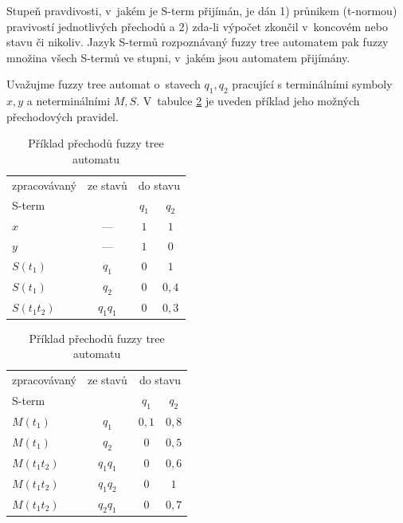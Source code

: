
Stupeň pravdivosti, v~jakém je S-term přijímán, je dán 1) průnikem (t-normou) pravivostí jednotlivých přechodů a 2) zda-li výpočet zkončil v~koncovém nebo stavu či nikoliv. Jazyk S-termů rozpoznávaný fuzzy tree automatem pak fuzzy množina všech S-termů ve stupni, v~jakém jsou automatem přijímány.

\begin{example}
  Uvažujme fuzzy tree automat o~stavech $q_1, q_2$ pracující s terminálními symboly $x, y$ a neterminálními $M, S$. V~tabulce \ref{tab:FuzTreAutTrans} je uveden příklad jeho možných přechodových pravidel.
\end{example}

\begin{table}
  \begin{tabular}{|l|c||c|c|}
    \hline 
    zpracovávaný	& ze stavů	& \multicolumn{2}{|c|}{do stavu}	\\
    S-term		& 		& $q_1$		& $q_2$		\\
    \hline \hline
    $x$			& ---		& $1$		& $1$		\\
    \hline \hline
    $y$			& ---		& $1$		& $0$		\\
    \hline \hline
    $S(t_1)$		& $q_1$		& $0$		& $1$		\\
    $S(t_1)$		& $q_2$		& $0$		& $0{,}4$	\\
    $S(t_1 t_2)$	& $q_1 q_1$	& $0$		& $0{,}3$	\\  
    \hline
  \end{tabular} \hfill
  \begin{tabular}{|l|c||c|c|}
    \hline 
    zpracovávaný	& ze stavů	& \multicolumn{2}{|c|}{do stavu}	\\
    S-term		& 		& $q_1$		& $q_2$		\\
    \hline \hline
    $M(t_1)$		& $q_1$		& $0{,}1$	& $0{,}8$	\\
    $M(t_1)$		& $q_2$		& $0$		& $0{,}5$	\\
    $M(t_1 t_2)$	& $q_1 q_1$	& $0$		& $0{,}6$	\\
    $M(t_1 t_2)$	& $q_1 q_2$	& $0$		& $1$		\\
    $M(t_1 t_2)$	& $q_2 q_1$	& $0$		& $0{,}7$	\\ 
    \hline
  \end{tabular}
  
  \caption[Příklad přechodů fuzzy tree automatu]{Příklad přechodů fuzzy tree automatu} \label{tab:FuzTreAutTrans}
\end{table}

